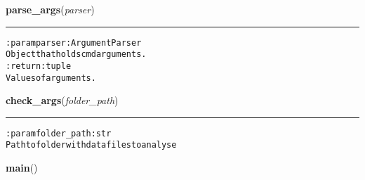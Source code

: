     \vspace{0.5ex}

\hspace{.8\funcindent}\begin{boxedminipage}{\funcwidth}

    \raggedright \textbf{parse\_args}(\textit{parser})

    \vspace{-1.5ex}

    \rule{\textwidth}{0.5\fboxrule}
\setlength{\parskip}{2ex}
\begin{alltt}

:param parser: ArgumentParser
    Object that holds cmd arguments.
:return: tuple
    Values of arguments.
\end{alltt}

\setlength{\parskip}{1ex}
    \end{boxedminipage}

    \label{pygce:analysis:cli:check_args}

    \vspace{0.5ex}

\hspace{.8\funcindent}\begin{boxedminipage}{\funcwidth}

    \raggedright \textbf{check\_args}(\textit{folder\_path})

    \vspace{-1.5ex}

    \rule{\textwidth}{0.5\fboxrule}
\setlength{\parskip}{2ex}
\begin{alltt}

:param folder\_path: str
    Path to folder with data files to analyse
\end{alltt}

\setlength{\parskip}{1ex}
    \end{boxedminipage}

    \label{pygce:analysis:cli:main}

    \vspace{0.5ex}

\hspace{.8\funcindent}\begin{boxedminipage}{\funcwidth}

    \raggedright \textbf{main}()

\setlength{\parskip}{2ex}
\setlength{\parskip}{1ex}
    \end{boxedminipage}

